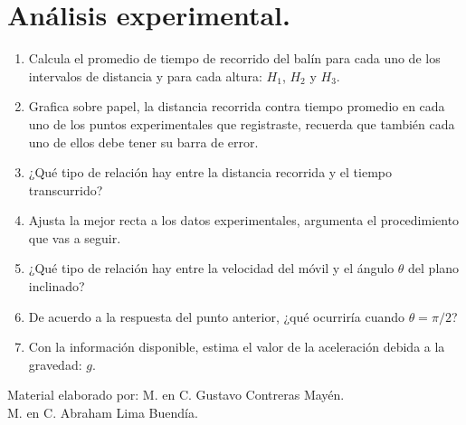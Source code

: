 \section{Análisis experimental.}
\begin{enumerate}
\item Calcula el promedio de tiempo de recorrido del balín para cada uno de los intervalos de distancia y para cada altura: $H_{1}$, $H_{2}$ y $H_{3}$.
\item Grafica sobre papel, la distancia recorrida contra tiempo promedio en cada uno de los puntos experimentales que registraste, recuerda que también cada uno de ellos debe tener su barra de error.
\item ¿Qué tipo de relación hay entre la distancia recorrida y el tiempo transcurrido?
\item Ajusta la mejor recta a los datos experimentales, argumenta el procedimiento que vas a seguir.
\item ¿Qué tipo de relación hay entre la velocidad del móvil y el ángulo $\theta$ del plano inclinado?
\item De acuerdo a la respuesta del punto anterior, ¿qué ocurriría cuando $\theta = \pi/2$?
\item Con la información disponible, estima el valor de la aceleración debida a la gravedad: $g$.
\end{enumerate}
\small{Material elaborado por: M. en C. Gustavo Contreras Mayén. \\ \hspace*{4cm} M. en C. Abraham Lima Buendía.}
